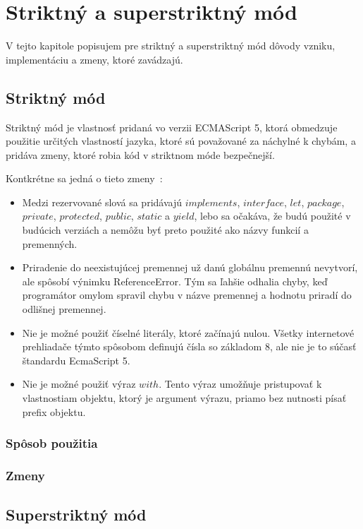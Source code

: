 \chapter{Striktný a superstriktný mód}

\label{kap:striktny_mod} %

V tejto kapitole popisujem pre striktný a superstriktný mód dôvody vzniku, implementáciu a zmeny, ktoré zavádzajú.

\section{Striktný mód}
Striktný mód je vlastnosť pridaná vo verzii ECMAScript 5, ktorá obmedzuje použitie určitých vlastností jazyka, ktoré sú považované za náchylné k chybám, a pridáva zmeny, ktoré robia kód v striktnom móde bezpečnejší.

Kontkrétne sa jedná o tieto zmeny~\cite{EcmaScript}:
\begin{itemize}
\item Medzi rezervované slová sa pridávajú $implements$, $interface$, $let$, $package$, $private$, $protected$, $public$, $static$ a $yield$, lebo sa očakáva, že budú použité v budúcich verziách a nemôžu byť preto použité ako názvy funkcií a premenných.
\item Priradenie do neexistujúcej premennej už danú globálnu premennú nevytvorí, ale spôsobí výnimku ReferenceError. Tým sa ľahšie odhalia chyby, keď programátor omylom spravil chybu v názve premennej a hodnotu priradí do odlišnej premennej.
\item Nie je možné použiť číselné literály, ktoré začínajú nulou. Všetky internetové prehliadače týmto spôsobom definujú čísla so základom 8, ale nie je to súčasť štandardu EcmaScript 5.
\item Nie je možné použiť výraz $with$. Tento výraz umožňuje pristupovať k vlastnostiam objektu, ktorý je argument výrazu, priamo bez nutnosti písať prefix objektu.
\end{itemize}

\subsection{Spôsob použitia}

\subsection{Zmeny}

\section{Superstriktný mód}

